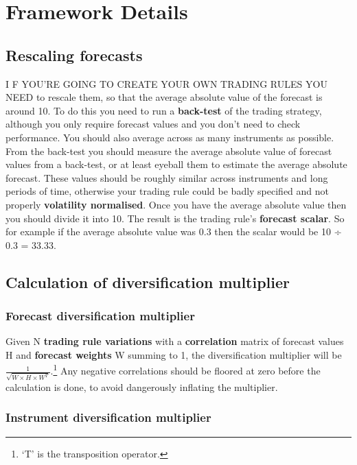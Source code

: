 \chapter{Framework Details}

\section*{Rescaling forecasts}  {}

I F YOU'RE GOING TO CREATE YOUR OWN TRADING RULES YOU NEED to rescale them, so that the average absolute value of the forecast is around 10. To do this you need to run a \textbf{back-test} of the trading strategy, although you only require forecast values and you don't need to check performance. You should also average across as many instruments as possible. From the back-test you should measure the average absolute value of forecast values from a back-test, or at least eyeball them to estimate the average absolute forecast. These values should be roughly similar across instruments and long periods of time, otherwise your trading rule could be badly specified and not properly \textbf{volatility normalised}. Once you have the average absolute value then you should divide it into 10. The result is the trading rule's \textbf{forecast scalar}. So for example if the average absolute value was 0.3 then the scalar would be 10 ÷ 0.3 = 33.33.

\section*{Calculation of diversification multiplier}  {}

\subsection*{Forecast diversification multiplier}

Given N \textbf{trading rule variations} with a \textbf{correlation} matrix of forecast values H and \textbf{forecast weights} W summing to 1, the diversification multiplier will be \(\frac{1}{\sqrt{W \times H \times W^T}}\).\footnote{‘T' is the transposition operator.} Any negative correlations should be floored at zero before the calculation is done, to avoid dangerously inflating the multiplier.

\subsection*{Instrument diversification multiplier}

